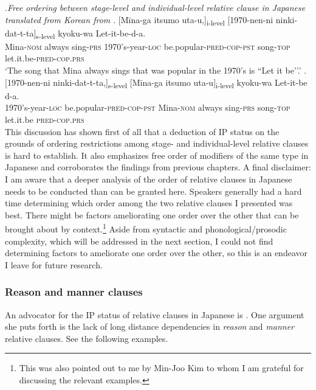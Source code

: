 \documentclass [output=book,colorlinks,citecolor=brown]{langscibook}
\begin{document}

\ex.\emph{Free ordering between stage-level and individual-level relative clause in Japanese translated from Korean from \citet[85]{kim:2019:syntax}}
\ag. [Mīna-ga itsumo uta-u,]\textsubscript{i-level} [1970-nen-ni ninki-dat-t-ta]\textsubscript{s-level} kyoku-wa Let-it-be-d-a.\\
Mina-\textsc{nom} always sing-\textsc{prs} 1970's-year-\textsc{loc} be.popular-\textsc{pred-cop-pst} song-\textsc{top} let.it.be-\textsc{pred-cop.prs}\\
`The song that Mina always sings that was popular in the 1970's is ``Let it be’’.’
\bg. [1970-nen-ni ninki-dat-t-ta,]\textsubscript{s-level} [Mīna-ga itsumo uta-u]\textsubscript{i-level} kyoku-wa Let-it-be d-a.\\
1970's-year-\textsc{loc} be.popular-\textsc{pred-cop-pst} Mina-\textsc{nom} always sing-\textsc{prs} song-\textsc{top} let.it.be \textsc{pred-cop.prs}\\

This discussion has shown first of all that a deduction of IP status on the grounds of ordering restrictions among stage- and individual-level relative clauses is hard to establish. It also emphasizes free order of modifiers of the same type in Japanese and corroborates the findings from previous chapters. A final disclaimer: I am aware that a deeper analysis of the order of relative clauses in Japanese needs to be conducted than can be granted here. Speakers generally had a hard time determining which order among the two relative clauses I presented was best. There might be factors ameliorating one order over the other that can be brought about by context.\footnote{This was also pointed out to me by Min-Joo Kim to whom I am grateful for discussing the relevant examples.} Aside from syntactic and phonological/prosodic complexity, which will be addressed in the next section, I could not find determining factors to ameliorate one order over the other, so this is an endeavor I leave for future research.

\subsubsection{Reason and manner clauses} \label{reason and manner}

An advocator for the IP status of relative clauses in Japanese is \citet{murasugi:1991:noun}. One argument she puts forth is the lack of long distance dependencies in \textit{reason} and \textit{manner} relative clauses. See the following examples. %
\end{document}
